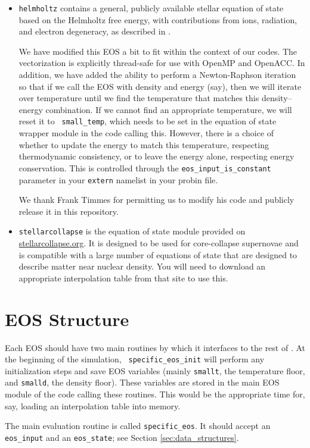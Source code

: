 \begin{itemize}
\item {\tt helmholtz} contains a general, publicly available stellar
  equation of state based on the Helmholtz free energy, with
  contributions from ions, radiation, and electron degeneracy, as
  described in \cite{timmes:1999,timmes:2000,flash}.

We have modified this EOS a bit to fit within the context of our
codes. The vectorization is explicitly thread-safe for use with OpenMP
and OpenACC.  In addition, we have added the ability to perform a
Newton-Raphson iteration so that if we call the EOS with density and
energy (say), then we will iterate over temperature until we find the
temperature that matches this density--energy combination. If we
cannot find an appropriate temperature, we will reset it to {\tt
  small\_temp}, which needs to be set in the equation of state wrapper
module in the code calling this. However, there is a choice of whether
to update the energy to match this temperature, respecting
thermodynamic consistency, or to leave the energy alone, respecting
energy conservation. This is controlled through the
\texttt{eos\_input\_is\_constant} parameter in your \texttt{extern}
namelist in your probin file.

We thank Frank Timmes for permitting us to modify his code and
publicly release it in this repository.

\item {\tt stellarcollapse} is the equation of state module provided
  on \href{stellarcollapse.org}{stellarcollapse.org}. It is designed
  to be used for core-collapse supernovae and is compatible with a
  large number of equations of state that are designed to describe
  matter near nuclear density. You will need to download an
  appropriate interpolation table from that site to use this.

\end{itemize}



\section{EOS Structure}

Each EOS should have two main routines by which it interfaces to the
rest of \castro.  At the beginning of the simulation, {\tt
  specific\_eos\_init} will perform any initialization steps and save
EOS variables (mainly \texttt{smallt}, the temperature floor, and
\texttt{smalld}, the density floor). These variables are stored in the
main EOS module of the code calling these routines. This would be the
appropriate time for, say, loading an interpolation table into memory.

The main evaluation routine is called {\tt specific\_eos}. It should
accept an {\tt eos\_input} and an {\tt eos\_state}; see Section
\ref{sec:data_structures}.



